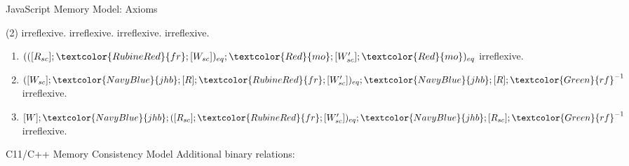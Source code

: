 \documentclass[xcolor={dvipsnames}, notes]{beamer}
\newcommand{\rf}{\textcolor{Green}{rf}}
\newcommand{\mo}{\textcolor{Red}{mo}}
\newcommand{\fr}{\textcolor{RubineRed}{fr}}
\newcommand{\xhb}{\textcolor{NavyBlue}{xhb}}
\newcommand{\jhb}{\textcolor{NavyBlue}{jhb}}
\newcommand{\jmo}{\textcolor{Red}{jmo}}
\begin{document}
    \begin{frame}{JavaScript Memory Model: Axioms}
        
        \begin{tasks}(2)
            \task {\jhb} irreflexive.
            \task {\jhb;\jmo} irreflexive.
            \task {\jhb;\rf} irreflexive.
            \task {$(\fr;\xhb)_{op}$} irreflexive.
        \end{tasks}

        \begin{enumerate}
            \item {$(([R_{sc}];\fr;[W_{sc}])_{eq};\mo;[W'_{sc}];\mo)_{eq}$} irreflexive.
            \item {$([W_{sc}];\jhb;[R];\fr;[W'_{sc}])_{eq};\jhb;[R];\rf^{-1}$} irreflexive. %
            \item {$[W];\jhb;([R_{sc}];\fr;[W'_{sc}])_{eq};\jhb;[R_{sc}];\rf^{-1}$} irreflexive.
        \end{enumerate}
    \end{frame}

    \begin{frame}{C11/C++ Memory Consistency Model}
        Additional binary relations:
    \end{frame}

\end{document}
